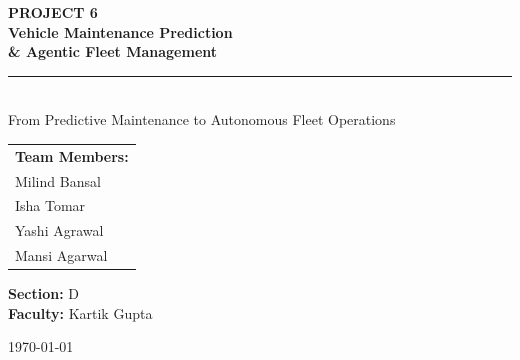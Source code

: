 \documentclass[12pt, a4paper]{article}
\begin{document}
\begin{titlepage}
    \centering
    \vspace*{2cm}

    {\Large \textbf{PROJECT 6}}\\[1.2cm]

    {\Huge\bfseries\color{solarblue}
    Vehicle Maintenance Prediction}\\[0.5cm]

    {\Large\bfseries\color{solaramber}
    \& Agentic Fleet Management}\\[0.8cm]

    \rule{\linewidth}{1.2pt}\\[0.8cm]

    {\large From Predictive Maintenance to Autonomous Fleet Operations}

    \vspace{1.5cm}

    \begin{tabular}{l}
        \textbf{Team Members:} \\
        Milind Bansal \\
        Isha Tomar \\
        Yashi Agrawal \\
        Mansi Agarwal \\
    \end{tabular}

    \vspace{1cm}

    \textbf{Section:} D \\[0.2cm]
    \textbf{Faculty:} Kartik Gupta

    \vfill
    \today
\end{titlepage}
\newpage

\end{document}
